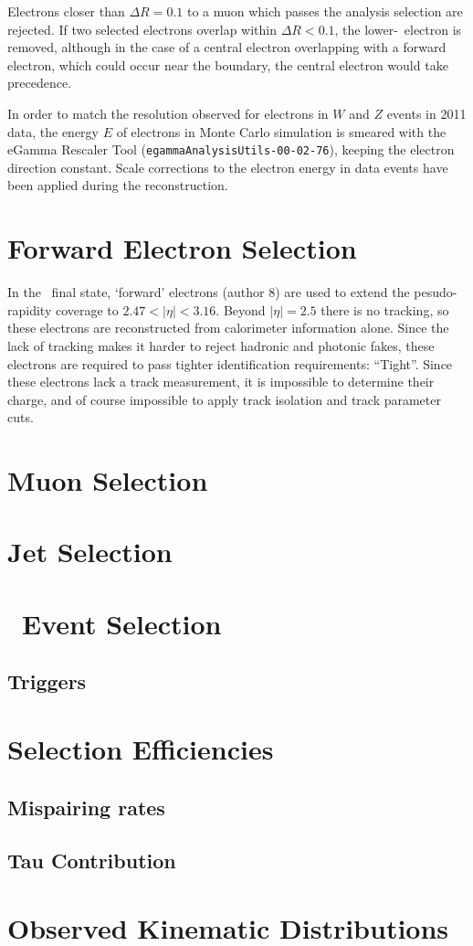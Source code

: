 Electrons closer than $\Delta R=0.1$ to a muon which passes the analysis selection 
are rejected. If two selected electrons overlap within $\Delta R < 0.1$, the
lower-\pt\ electron is removed, although in the case of a central electron
overlapping with a forward electron, which could occur near the boundary, the
central electron would take precedence.

In order to match the resolution observed for electrons in $W$ and $Z$
events in 2011 data, the energy $E$ of electrons in
Monte Carlo simulation is smeared with the eGamma Rescaler
Tool (\texttt{egammaAnalysisUtils-00-02-76}), keeping the electron direction 
constant. Scale corrections to
the electron energy in data events have been applied during the reconstruction.

\section{Forward Electron Selection}

In the \llll\ final state, `forward' electrons (author 8) are used
to extend the pesudo-rapidity coverage to $2.47<|\eta|<3.16$. Beyond $|\eta|=2.5$
there is no tracking, so these electrons are reconstructed from calorimeter
information alone. Since the lack of tracking makes it harder to reject hadronic
and photonic fakes, these electrons are required to pass tighter
identification requirements: ``Tight''. Since these electrons lack a track
measurement, it is impossible to determine their charge, and of course
impossible to apply track isolation and track parameter cuts. 

\section{Muon Selection}
\section{Jet Selection}
\section{\ZZ\ Event Selection}
\subsection{Triggers}
\section{Selection Efficiencies}
\subsection{\CZZ}
\subsection{Mispairing rates}
\subsection{Tau Contribution}
\section{Observed Kinematic Distributions}
